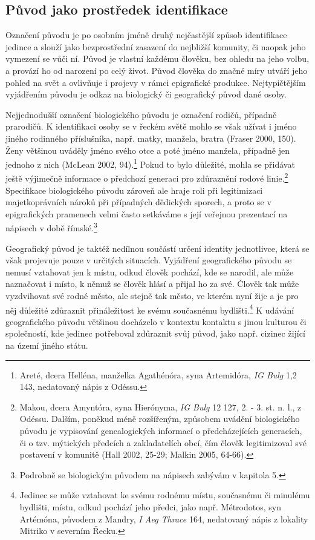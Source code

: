 
\subsection[původ-jako-prostředek-identifikace]{Původ jako prostředek identifikace}

Označení původu je po osobním jméně druhý nejčastější způsob identifikace jedince a slouží jako bezprostřední zasazení do nejbližší komunity, či naopak jeho vymezení se vůči ní. Původ je vlastní každému člověku, bez ohledu na jeho volbu, a provází ho od narození po celý život. Původ člověka do značné míry utváří jeho pohled na svět a ovlivňuje i projevy v rámci epigrafické produkce. Nejtypičtějším vyjádřením původu je odkaz na biologický či geografický původ dané osoby.

Nejjednodušší označení biologického původu je označení rodičů, případně prarodičů. K identifikaci osoby se v řeckém světě mohlo se však užívat i jméno jiného rodinného příslušníka, např. matky, manžela, bratra (Fraser 2000, 150). Ženy většinou uváděly jméno svého otce a poté jméno manžela, případně jen jednoho z nich (McLean 2002, 94).\footnote{Areté, dcera Helléna, manželka Agathénóra, syna Artemidóra, {\em IG Bulg} 1,2 143, nedatovaný nápis z Odéssu.} Pokud to bylo důležité, mohla se přidávat ještě výjimečně informace o předchozí generaci pro zdůraznění rodové linie.\footnote{Makou, dcera Amyntóra, syna Hierónyma, {\em IG Bulg} 12 127, 2. - 3. st. n. l., z Odéssu. Dalším, poněkud méně rozšířeným, způsobem uvádění biologického původu je vypisování genealogických informací o předcházejících generacích, či o tzv. mýtických předcích a zakladatelích obcí, čím člověk legitimizoval své postavení v komunitě (Hall 2002, 25-29; Malkin 2005, 64-66).} Specifikace biologického původu zároveň ale hraje roli při legitimizaci majetkoprávních nároků při případných dědických sporech, a proto se v epigrafických pramenech velmi často setkáváme s její veřejnou prezentací na nápisech v době římské.\footnote{Podrobně se biologickým původem na nápisech zabývám v kapitola 5.}

Geografický původ je taktéž nedílnou součástí určení identity jednotlivce, která se však projevuje pouze v určitých situacích. Vyjádření geografického původu se nemusí vztahovat jen k místu, odkud člověk pochází, kde se narodil, ale může naznačovat i místo, k němuž se člověk hlásí a přijal ho za své. Člověk tak může vyzdvihovat své rodné město, ale stejně tak město, ve kterém nyní žije a je pro něj důležité zdůraznit přináležitost ke svému současnému bydlišti.\footnote{Jedinec se může vztahovat ke svému rodnému místu, současnému či minulému bydlišti, místu, odkud pochází jeho předci, jako např. Métrodotos, syn Artémóna, původem z Mandry, {\em I Aeg Thrace} 164, nedatovaný nápis z lokality Mitriko v severním Řecku.} K udávání geografického původu většinou docházelo v kontextu kontaktu s jinou kulturou či společností, kde jedinec potřeboval zdůraznit svůj původ, jako např. cizinec žijící na území jiného státu.

